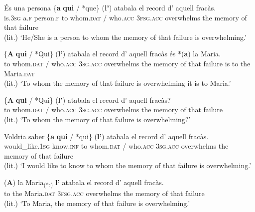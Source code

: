 \documentclass[output=paper,colorlinks,citecolor=brown,modfonts,nonflat]{langsci/langscibook}
\begin{document}
{{\ea%
 \label{ex:royo:14}
 \ea \label{ex:royo:14a}
 \gll És una persona \{\textbf{a} \textbf{qui} / *que\} (\textbf{l’}) atabala el record d’ aquell fracàs.\\
  is.\textsc{3sg} a.\textsc{f} person.\textsc{f} to whom.\textsc{dat} / who.\textsc{acc} \textsc{3fsg.acc} overwhelms the memory of that failure\\
\glt (lit.) ‘He/She is a person to whom the memory of that failure is overwhelming.’

 \ex \label{ex:royo:14b}
 \gll \{\textbf{A} \textbf{qui} / *Qui\} (\textbf{l’}) atabala el record d’ aquell fracàs és *(\textbf{a}) la Maria.\\
 to whom.\textsc{dat} / who.\textsc{acc} \textsc{3sg.acc} overwhelms the memory of that failure is to the Maria.\textsc{dat}\\
\glt (lit.) ‘To whom the memory of that failure is overwhelming it is to Maria.’

 \ex \label{ex:royo:14c}
 \gll \{\textbf{A} \textbf{qui} / *Qui\} (\textbf{l’}) atabala el record d' aquell fracàs?\\
 to whom.\textsc{dat} / who.\textsc{acc} \textsc{3sg.acc} overwhelms the memory of that failure\\
\glt (lit.) ‘To whom the memory of that failure is overwhelming?’

 \ex \label{ex:royo:14d}
 \gll Voldria saber \{\textbf{a} \textbf{qui} / *qui\} (\textbf{l’}) atabala el record d’ aquell fracàs.\\
 would\_like.\textsc{1sg} know.\textsc{inf}  to whom.\textsc{dat} / who.\textsc{acc} \textsc{3sg.acc} overwhelms the memory of that failure\\
\glt (lit.) ‘I would like to know to whom the memory of that failure is overwhelming.’

 \ex \label{ex:royo:14e}
 \gll *(\textbf{A}) la Maria\textsubscript{(*},\textsubscript{)} \textbf{l’} atabala el record d’ aquell fracàs.\footnotemark{}\\
 to the Maria.\textsc{dat} \textsc{3fsg.acc} overwhelms the memory of that failure\\
\glt (lit.) ‘To Maria, the memory of that failure is overwhelming.’
 \z
 \z




}}
\end{document}
